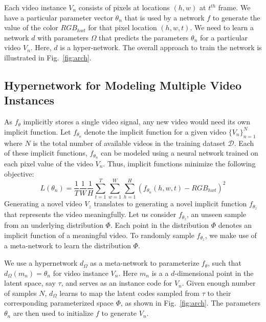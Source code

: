 \documentclass[10pt]{article} \usepackage[accepted]{tmlr}
\begin{document}
\label{method}
Each video instance $V_n$ consists of pixels at locations $(h,w)$ at $t^{th}$ frame. We have a particular parameter vector $\theta_n$ that is used by a network $f$ to generate the value of the color $RGB_{hwt}$ for that pixel location $(h,w,t)$. We need to learn a network $d$ with parameters $\Omega$ that predicts the parameters $\theta_n$ for a particular video $V_n$. Here, $d$ is a hyper-network. The overall approach to train the network is illustrated in Fig.~\ref{fig:arch}.

\subsection{Hypernetwork for Modeling Multiple Video Instances}

As  $f_\theta$ implicitly stores a single video signal, any new video would need its own implicit function. 
Let $f_{\theta_n}$ denote the implicit function for a given video $\{V_n\}_{n=1}^{N}$ where $N$ is the total number of available videos in the training dataset $\mathcal{D}$. Each of these implicit functions, $f_{\theta_n}$ can be modeled using a neural network trained on each pixel value of the video $V_n$. Thus, implicit functions minimize the following objective: 
\begin{equation}
    L(\theta_n) = \frac{1}{T}\frac{1}{W}\frac{1}{H}\sum_{t=1}^{T}\sum_{w=1}^{W}\sum_{h=1}^{H} (f_{\theta_n}(h, w, t) - RGB_{hwt})^2
\label{eqn:single_ftheta}
\end{equation}
Generating a novel video $V_z$ translates to generating a novel implicit function $f_{\theta_z}$ that represents the video meaningfully. Let us consider $f_{\theta_z}$, an unseen sample from an underlying distribution $\Phi$. Each point in the distribution $\Phi$ denotes an implicit function of a meaningful video. To randomly sample $f_{\theta_z}$, we make use of a meta-network to learn the distribution $\Phi$. 

We use a hypernetwork $d_\Omega$ as a meta-network to parameterize $f_\theta$, such that $d_\Omega(m_n) = \theta_n$ for video instance $V_n$. Here $m_n$ is a a $d$-dimensional point in the latent space, say $\tau$, and serves as an instance code for $V_n$.
Given enough number of samples $N$, $d_\Omega$ learns to map the latent codes sampled from $\tau$ to their corresponding parameterized space $\Phi$, as shown in Fig.~\ref{fig:arch}. 
The parameters $\theta_n$ are then used to initialize $f$ to generate $V_n$.
\end{document}
